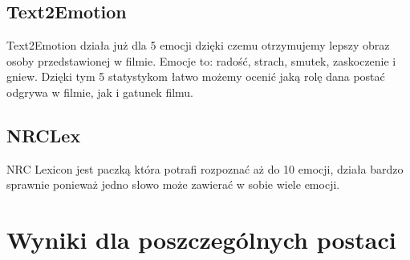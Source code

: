 \documentclass[a4paper,12pt]{article}
\begin{document}
	\subsection{Text2Emotion}
	Text2Emotion działa już dla 5 emocji dzięki czemu otrzymujemy lepszy obraz osoby przedstawionej w filmie.
	Emocje to: radość, strach, smutek, zaskoczenie i gniew.
	Dzięki tym 5 statystykom łatwo możemy ocenić jaką rolę dana postać odgrywa w filmie, jak i gatunek filmu.
	\subsection{NRCLex}
	NRC Lexicon jest paczką która potrafi rozpoznać aż do 10 emocji, działa bardzo sprawnie ponieważ jedno słowo może zawierać w sobie wiele emocji.
	\clearpage
	\section {Wyniki dla poszczególnych postaci}
\end{document}
